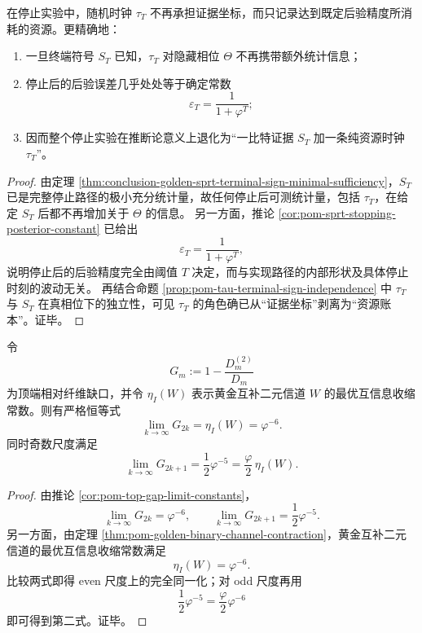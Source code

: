 \begin{corollary}[停止时钟的纯资源性]\label{cor:conclusion-golden-sprt-clock-is-pure-resource}
在停止实验中，随机时钟 \(\tau_T\) 不再承担证据坐标，而只记录达到既定后验精度所消耗的资源。更精确地：
\begin{enumerate}
  \item 一旦终端符号 \(S_T\) 已知，\(\tau_T\) 对隐藏相位 \(\Theta\) 不再携带额外统计信息；
  \item 停止后的后验误差几乎处处等于确定常数
  \[
  \varepsilon_T=\frac{1}{1+\varphi^T};
  \]
  \item 因而整个停止实验在推断论意义上退化为“一比特证据 \(S_T\) 加一条纯资源时钟 \(\tau_T\)”。
\end{enumerate}
\end{corollary}
\begin{proof}
由定理 \ref{thm:conclusion-golden-sprt-terminal-sign-minimal-sufficiency}，\(S_T\) 已是完整停止路径的极小充分统计量，故任何停止后可测统计量，包括 \(\tau_T\)，在给定 \(S_T\) 后都不再增加关于 \(\Theta\) 的信息。
另一方面，推论 \ref{cor:pom-sprt-stopping-posterior-constant} 已给出
\[
\varepsilon_T=\frac{1}{1+\varphi^T},
\]
说明停止后的后验精度完全由阈值 \(T\) 决定，而与实现路径的内部形状及具体停止时刻的波动无关。
再结合命题 \ref{prop:pom-tau-terminal-sign-independence} 中 \(\tau_T\) 与 \(S_T\) 在真相位下的独立性，可见 \(\tau_T\) 的角色确已从“证据坐标”剥离为“资源账本”。证毕。
\end{proof}



\begin{theorem}[几何顶端谱缺口与信息收缩常数的同一律]\label{thm:conclusion-golden-top-gap-equals-sdpi}
令
\[
G_m:=1-\frac{D_m^{(2)}}{D_m}
\]
为顶端相对纤维缺口，并令 \(\eta_I(W)\) 表示黄金互补二元信道 \(W\) 的最优互信息收缩常数。则有严格恒等式
\[
\boxed{\;
\lim_{k\to\infty}G_{2k}
=
\eta_I(W)
=
\varphi^{-6}.
\;}
\]
同时奇数尺度满足
\[
\boxed{\;
\lim_{k\to\infty}G_{2k+1}
=
\frac12\varphi^{-5}
=
\frac{\varphi}{2}\,\eta_I(W).
\;}
\]
\end{theorem}
\begin{proof}
由推论 \ref{cor:pom-top-gap-limit-constants}，
\[
\lim_{k\to\infty}G_{2k}=\varphi^{-6},
\qquad
\lim_{k\to\infty}G_{2k+1}=\frac12\varphi^{-5}.
\]
另一方面，由定理 \ref{thm:pom-golden-binary-channel-contraction}，黄金互补二元信道的最优互信息收缩常数满足
\[
\eta_I(W)=\varphi^{-6}.
\]
比较两式即得 even 尺度上的完全同一化；对 odd 尺度再用
\[
\frac12\varphi^{-5}=\frac{\varphi}{2}\varphi^{-6}
\]
即可得到第二式。证毕。
\end{proof}

